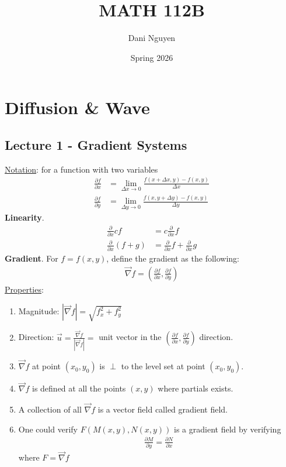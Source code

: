 \documentclass[12pt, letterpaper]{article}
\title{MATH 112B}
\author{Dani Nguyen}
\date{Spring 2026}
\begin{document}
\maketitle
\tableofcontents


\section{Diffusion \& Wave}
\subsection{Lecture 1 - Gradient Systems}
\underline{Notation}: for a function with two variables
\begin{align*}
    \frac{\partial f}{\partial x} &= \lim_{\Delta x \rightarrow 0} 
    \frac{f(x+\Delta x,y) - f(x,y)}{\Delta x} \\
    \frac{\partial f}{\partial y} &= \lim_{\Delta y \rightarrow 0} 
    \frac{f(x,y+\Delta y) - f(x,y)}{\Delta y}
\end{align*}
\textbf{Linearity}.
\begin{align}
    \frac{\partial}{\partial x} cf &= c \frac{\partial}{\partial x}f \\
    \frac{\partial}{\partial x} (f+g) &= \frac{\partial}{\partial x} f + 
    \frac{\partial}{\partial x} g
\end{align}
\textbf{Gradient}. For $f = f(x,y)$, define the gradient as the following:
\begin{align*}
    \vec{\nabla} f = \left(\frac{\partial f}{\partial x},\frac{\partial f}{\partial y}\right)
\end{align*}
\underline{Properties}:
\begin{enumerate}
    \item Magnitude: $|\vec{\nabla}f| = \sqrt{f_x^2 + f_y^2}$
    \item Direction: $\vec{u} = \frac{\vec{\nabla}f}{|\vec{\nabla}f|} = $ 
    unit vector in the $(\frac{\partial f}{\partial x},\frac{\partial f}{\partial y})$
    direction.
    \item $\vec{\nabla}f$ at point $(x_0,y_0)$ is $\perp$ to the level set at
    point $(x_0,y_0)$.
    \item $\vec{\nabla}f$ is defined at all the points $(x,y)$ where partials exists.
    \item A collection of all $\vec{\nabla}f$ is a vector field called gradient field.
    \item One could verify $F(M(x,y),N(x,y))$ is a gradient field by verifying
    \begin{align*}
        \boxed{\frac{\partial M}{\partial y} = \frac{\partial N}{\partial x}}
    \end{align*}
    where $F = \vec{\nabla} f$
\end{enumerate}
\end{document}
